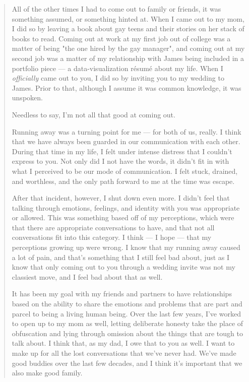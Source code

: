 \begin{paracol}{2}
\begin{leftcolumn}
\begin{quotation}
All of the other times I had to come out to family or friends, it was something assumed, or something hinted at.  When I came out to my mom, I did so by leaving a book about gay teens and their stories on her stack of books to read.  Coming out at work at my first job out of college was a matter of being "the one hired by the gay manager", and coming out at my second job was a matter of my relationship with James being included in a portfolio piece --- a data-visualization résumé about my life. When I \emph{officially} came out to you, I did so by inviting you to my wedding to James.  Prior to that, although I assume it was common knowledge, it was unspoken.

Needless to say, I'm not all that good at coming out.

Running away was a turning point for me --- for both of us, really.  I think that we have always been guarded in our communication with each other.  During that time in my life, I felt under intense distress that I couldn't express to you.  Not only did I not have the words, it didn't fit in with what I perceived to be our mode of communication.  I felt stuck, drained, and worthless, and the only path forward to me at the time was escape.

After that incident, however, I shut down even more.  I didn't feel that talking through emotions, feelings, and identity with you was appropriate or allowed.  This was something based off of my perceptions, which were that there are appropriate conversations to have, and that not all conversations fit into this category.  I think --- I hope --- that my perceptions growing up were wrong.  I know that my running away caused a lot of pain, and that's something that I still feel bad about, just as I know that only coming out to you through a wedding invite was not my classiest move, and I feel bad about that as well.

It has been my goal with my friends and partners to have relationships based on the ability to share the emotions and problems that are part and parcel to being a living human being.  Over the last few years, I've worked to open up to my mom as well, letting deliberate honesty take the place of obfuscation and lying through omission about the things that are tough to talk about.  I think that, as my dad, I owe that to you as well.  I want to make up for all the lost conversations that we've never had.  We've made good buddies over the last few decades, and I think it's important that we also make good family.


\end{quotation}
\end{leftcolumn}
\end{paracol}
